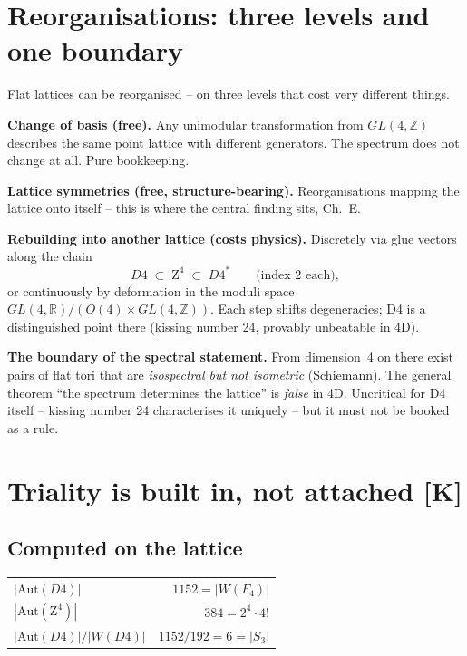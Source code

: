 \chapter{Reorganisations: three levels and one boundary}

Flat lattices can be reorganised -- on three levels that cost very
different things.

\textbf{Change of basis (free).} Any unimodular transformation from
$GL(4,\mathbb{Z})$ describes the same point lattice with different
generators. The spectrum does not change at all. Pure bookkeeping.

\textbf{Lattice symmetries (free, structure-bearing).}
Reorganisations mapping the lattice onto itself -- this is where the
central finding sits, Ch.~E.

\textbf{Rebuilding into another lattice (costs physics).} Discretely
via glue vectors along the chain
\begin{equation}
  D4 \;\subset\; \text{Z}^4 \;\subset\; D4^{*}
  \qquad\text{(index 2 each)},
\end{equation}
or continuously by deformation in the moduli space
$GL(4,\mathbb{R})/(O(4)\times GL(4,\mathbb{Z}))$. Each step shifts
degeneracies; D4 is a distinguished point there (kissing number 24,
provably unbeatable in 4D).

\textbf{The boundary of the spectral statement.} From dimension~4 on
there exist pairs of flat tori that are \emph{isospectral but not
isometric} (Schiemann). The general theorem \enquote{the spectrum
determines the lattice} is \emph{false} in 4D. Uncritical for D4
itself -- kissing number 24 characterises it uniquely -- but it must
not be booked as a rule.

\chapter{Triality is built in, not attached [K]}

\section{Computed on the lattice}

\begin{center}
\begin{tabular}{lr}
\toprule
$|\text{Aut}(D4)|$ & $1152 = |W(F_4)|$ \\
$|\text{Aut}(\text{Z}^4)|$ & $384 = 2^4\cdot4!$ \\
$|\text{Aut}(D4)|/|W(D4)|$ & $1152/192 = 6 = |S_3|$ \\
\bottomrule
\end{tabular}
\end{center}

